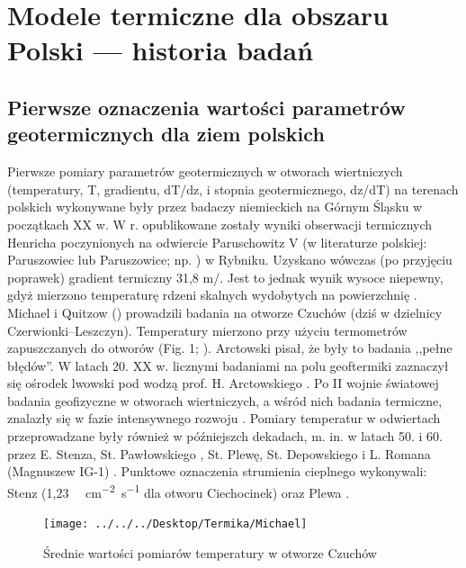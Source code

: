 \documentclass[11.5pt,twoside]{report}
\newcommand{\ct}[1]{\ignorespaces} %
\begin{document}

\chapter{Modele termiczne dla obszaru Polski --- historia badań}

\section{Pierwsze oznaczenia wartości parametrów geotermicznych dla ziem polskich}

Pierwsze pomiary parametrów geotermicznych w otworach wiertniczych (temperatury, T, gradientu, dT/dz, i stopnia geotermicznego, dz/dT) na terenach polskich wykonywane były przez badaczy niemieckich na Górnym Śląsku w początkach XX w. W \citeyear{Henrich.1904} r. opublikowane zostały wyniki obserwacji termicznych Henricha poczynionych na odwiercie Paruschowitz V (w literaturze polskiej: Paruszowiec lub Paruszowice; np. \cite{Plewa.1966,Stenz.1936}) w Rybniku. Uzyskano wówczas (po przyjęciu poprawek) gradient termiczny 31,8 m/{\textcelsius}. Jest to jednak wynik wysoce niepewny, gdyż mierzono temperaturę rdzeni skalnych wydobytych na powierzchnię \parencite{Maj.2010,Rudzki.1909,Henrich.1904}. Michael i Quitzow (\citeyear{Michael.1910}) prowadzili badania na otworze Czuchów (dziś w dzielnicy Czerwionki--Leszczyn). Temperatury mierzono przy użyciu termometrów zapuszczanych do otworów (Fig. 1; \cite{Michael.1910}). Arctowski \parencite{Arctowski.1923a} pisał, że były to badania ,,pełne błędów''. W latach 20. XX w. licznymi badaniami na polu geoftermiki zaznaczył się ośrodek lwowski pod wodzą prof. H. Arctowskiego \parencite{Plewa.1966,Maj.2010}. Po II wojnie światowej badania geofizyczne w otworach wiertniczych, a wśród nich badania termiczne, znalazły się w fazie intensywnego rozwoju \parencite{Plewa.1994}. Pomiary temperatur w odwiertach przeprowadzane były również w pó\'{z}niejszch dekadach, m. in. w latach 50. i 60. przez E. Stenza, St. Pawłowskiego \ct{(Łeba)}, St. Plewę, St. Depowskiego i L. Romana (Magnuszew IG-1) \parencite{Plewa.1966,Roman.1962,Stenz.1936}. \ct{dopisac gdzie były badania} Punktowe oznaczenia strumienia cieplnego wykonywali: Stenz \ct{\citeyear{Stenz.1954}} (1,23 \si[sticky-per]{\micro\calorie.cm^{-2}.s^{-1}} dla otworu Ciechocinek) oraz Plewa \ct{parencite{Plewa.1961,Plewa.1963a,Plewa.1963b,Plewa.1965,Plewa.1966}}. 

\begin{figure}[h]
	\centering
	\texttt{[image: ../../../Desktop/Termika/Michael]}
	\caption{Średnie wartości pomiarów temperatury w otworze Czuchów \parencite{Michael.1910}}
\end{figure}
\end{document}
